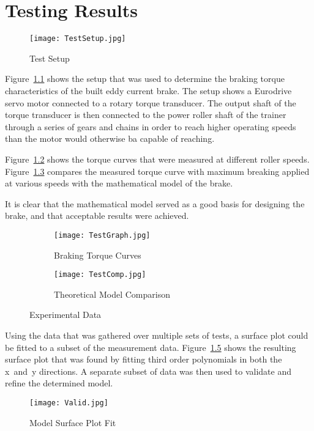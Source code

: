 
\chapter{Testing Results}
\label{ch:testing}

\begin{figure}[H]
	\centering
	\texttt{[image: TestSetup.jpg]}
	\caption{Test Setup}
	\label{fig:test}
\end{figure}

Figure~\ref{fig:test} shows the setup that was used to determine the braking torque characteristics of the built eddy current brake. The setup shows a Eurodrive servo motor connected to a rotary torque transducer. The output shaft of the torque transducer is then connected to the power roller shaft of the trainer through a series of gears and chains in order to reach higher operating speeds than the motor would otherwise ba capable of reaching.

Figure~\ref{fig:testgraph} shows the torque curves that were measured at different roller speeds. Figure~\ref{fig:sensorComp} compares the measured torque curve with maximum breaking applied at various speeds with the mathematical model of the brake. 

It is clear that the mathematical model served as a good basis for designing the brake, and that acceptable results were achieved.

\begin{figure}[H]
	\centering
	\begin{subfigure}[t]{.45\textwidth}
		\centering
		\texttt{[image: TestGraph.jpg]}
		\caption{Braking Torque Curves}
		\label{fig:testgraph}
	\end{subfigure}
	\hfill
	\begin{subfigure}[t]{.45\textwidth}
		\centering
		\texttt{[image: TestComp.jpg]}
		\caption{Theoretical Model Comparison}
		\label{fig:sensorComp}
	\end{subfigure}
	\caption{Experimental Data}
	\label{fig:tgraph}
\end{figure}

Using the data that was gathered over multiple sets of tests, a surface plot could be fitted to a subset of the measurement data. Figure~\ref{fig:valid} shows the resulting surface plot that was found by fitting third order polynomials in both the x~and~y directions. A separate subset of data was then used to validate and refine the determined model.

\begin{figure}[H]
	\centering
	\texttt{[image: Valid.jpg]}
	\caption{Model Surface Plot Fit}
	\label{fig:valid}
\end{figure}